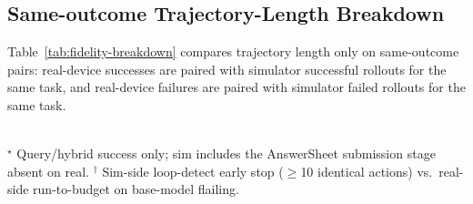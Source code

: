 \documentclass{llmxive}
\begin{document}
\subsection{Same-outcome Trajectory-Length Breakdown}\label{app:fidelity-breakdown}

Table~\ref{tab:fidelity-breakdown} compares trajectory length only on same-outcome pairs: real-device successes are paired with simulator successful rollouts for the same task, and real-device failures are paired with simulator failed rollouts for the same task.

\begin{table}[!htbp]
  \centering\small
  \setlength{\tabcolsep}{3pt}
  \\[2pt]
  \scriptsize $^\star$ Query/hybrid success only; sim includes the AnswerSheet submission stage absent on real. $^\dagger$ Sim-side loop-detect early stop ($\geq$10 identical actions) vs.\ real-side run-to-budget on base-model flailing.
  \caption{Same-outcome paired trajectory length on sim vs.\ real, broken down by Objective and outcome. $\Delta = $ Real $-$ Sim.}
  \label{tab:fidelity-breakdown}
\end{table}
\end{document}
